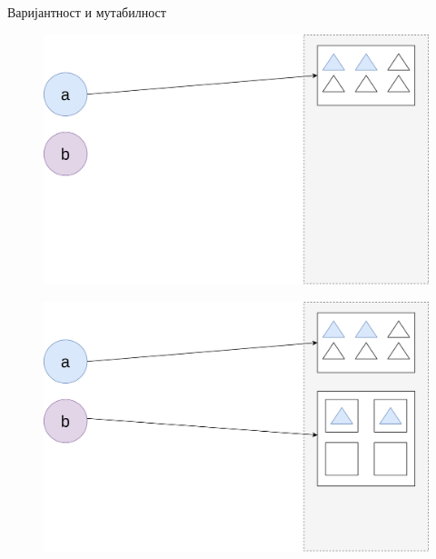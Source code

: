 \documentclass[xcolor=table]{beamer}
\begin{document}
\begin{frame}[allowframebreaks]{Варијантност и мутабилност}
        \framebreak
        
        \begin{figure}
            \centering
            \includegraphics[height=0.7\textheight,keepaspectratio]{images/arr0.png}
        \end{figure}
        
        \framebreak
        
        \begin{figure}
            \centering
            \includegraphics[height=0.7\textheight,keepaspectratio]{images/arr11.png}
        \end{figure}
        
        \framebreak
        

\end{frame}
\end{document}
